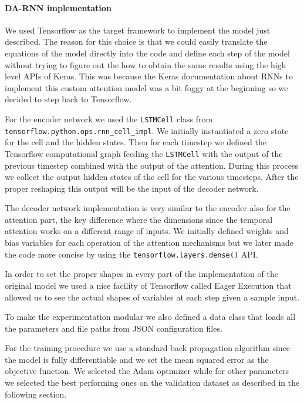 \documentclass{article}
\begin{document}
\paragraph{DA-RNN implementation}

We used Tensorflow as the target framework to implement the model just
described. The reason for this choice is that we
could easily translate the equations of the model directly into the code and
define each step of the model without
trying to figure out the how to obtain the same results using the high level
APIs of Keras. This was because the
Keras documentation about RNNs to implement this custom attention model was a
bit foggy at the beginning so we decided
to step back to Tensorflow. 

For the encoder network we used the \texttt{LSTMCell} class from
\texttt{tensorflow.python.ops.rnn\_cell\_impl}.
We initially instantiated a zero state for the cell and the hidden states. Then
for each timestep we defined the
Tensorflow computational graph feeding the \texttt{LSTMCell} with the output of
the previous timestep combined with the
output of the attention. During this process we collect the output hidden
states of the cell for the various timesteps.
After the proper reshaping this output will be the input of the decoder network.

The decoder network implementation is very similar to the encoder also for the
attention part, the key difference where
the dimensions since the temporal attention works on a different range of
inputs. We initially defined weights and bias
variables for each operation of the attention mechanisms but we later made the
code more concise by using the
\texttt{tensorflow.layers.dense()} API.

In order to set the proper shapes in every part of the implementation of the
original model we used a nice facility of
Tensorflow called Eager Execution that allowed us to see the actual shapes of
variables at each step given a sample
input.

To make the experimentation modular we also defined a data class that loads all
the parameters and file paths from
JSON configuration files.

For the training procedure we use a standard back propagation algorithm since
the model is fully differentiable and we
set the mean squared error as the objective function. We selected the Adam
optimizer while for other parameters we
selected the best performing ones on the validation dataset as described in the
following section.
\end{document}
